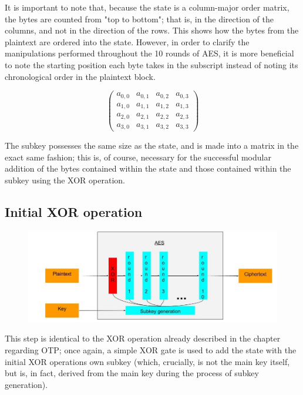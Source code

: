 \documentclass[12pt]{report}
\begin{document}
It is important to note that, because the state is a column-major order matrix, the bytes are counted from "top to bottom"; that is, in the direction of the columns, and not in the direction of the rows. This shows how the bytes from the plaintext are ordered into the state. However, in order to clarify the manipulations performed throughout the 10 rounds of AES, it is more beneficial to note the starting position each byte takes in the subscript instead of noting its chronological order in the plaintext block.

\[ \left( \begin{array}{cccc}
a_{0,0} & a_{0,1} & a_{0,2} & a_{0,3} \\
a_{1,0} & a_{1,1} & a_{1,2} & a_{1,3} \\
a_{2,0} & a_{2,1} & a_{2,2} & a_{2,3} \\
a_{3,0} & a_{3,1} & a_{3,2} & a_{3,3}\end{array} \right)\] 

The subkey possesses the same size as the state, and is made into a matrix in the exact same fashion; this is, of course, necessary for the successful modular addition of the bytes contained within the state and those contained within the subkey using the XOR operation.


\subsection{Initial XOR operation}

\begin{figure}[H]
\centering
\includegraphics[scale=0.4]{AES_fig2.jpg}
\end{figure}

This step is identical to the XOR operation already described in the chapter regarding OTP; once again, a simple XOR gate is used to add the state with the initial XOR operations own subkey (which, crucially, is not the main key itself, but is, in fact, derived from the main key during the process of subkey generation).
\end{document}
